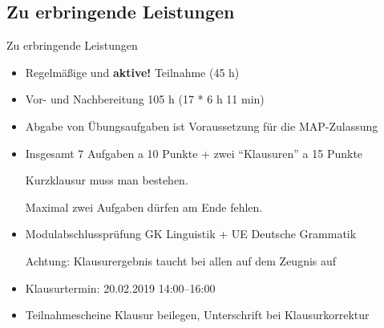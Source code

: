 %
\subsection{Zu erbringende Leistungen}

\begin{frame}{Zu erbringende Leistungen}

	\begin{itemize}
	\item Regelmäßige und \textbf{aktive!} Teilnahme (45 h)
        \item Vor- und Nachbereitung 105 h (17 * 6 h 11 min)
	\item Abgabe von Übungsaufgaben ist Voraussetzung für die MAP-Zulassung

        \item Insgesamt 7 Aufgaben a 10 Punkte + zwei ``Klausuren'' a 15 Punkte

              Kurzklausur muss man bestehen.

              Maximal zwei Aufgaben dürfen am Ende fehlen.






	\item Modulabschlussprüfung \ras GK Linguistik + UE Deutsche Grammatik

              Achtung: Klausurergebnis taucht bei allen auf dem Zeugnis auf

        \item Klausurtermin: 20.02.2019 14:00--16:00
        \item Teilnahmescheine Klausur beilegen, Unterschrift bei Klausurkorrektur
              
	\end{itemize}
	
\end{frame}


